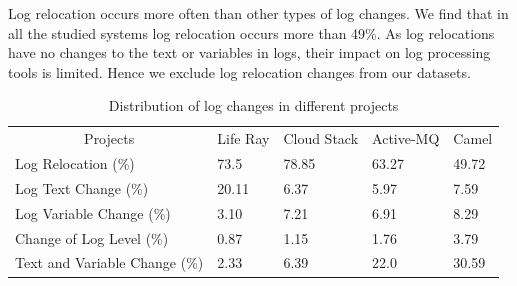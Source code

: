 Log relocation occurs more often than other types of log changes. We find that in all the studied systems log relocation occurs more than 49\%. As log relocations have no changes to the text or variables in logs, their impact on log processing tools is limited. Hence we exclude log relocation changes from our datasets. 


\begin{table}[t]
	\centering
	\caption{Distribution of log changes in different projects}
	\label{tba:logtype}
	\begin{tabular}{l|llll}
		\cline{1-5}  	\multicolumn{1}{|c}{Projects}    & \multicolumn{1}{|c}{ Life Ray }  &  \multicolumn{1}{|c}{ Cloud Stack}	   &  \multicolumn{1}{|c}{ Active-MQ }  & 
		 \multicolumn{1}{|c|}{ Camel } \\ \cline{1-5}   
		
		Log Relocation (\%)       & 73.5     & 78.85 &  63.27  & 49.72         \\
		
		Log Text Change (\%)      & 20.11    & 6.37 & 5.97    & 7.59       \\
		Log Variable Change (\%)   & 3.10     & 7.21 & 6.91 &  8.29     \\
		Change of Log Level (\%) & 0.87   & 1.15 & 1.76  &  3.79       \\ 
		Text and Variable Change (\%) & 2.33     & 6.39 & 22.0   &  30.59    \\ \cline{1-5}
	\end{tabular}
\end{table}


